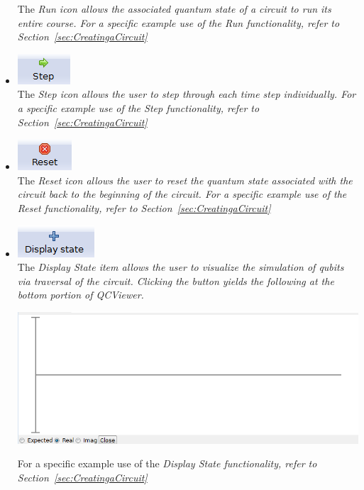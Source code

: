 \documentclass[10pt]{article}
\theoremstyle{definition}
\begin{document}
\begin{itemize}
The \em Run \em icon allows the associated quantum state of a circuit to run its entire course. For a specific example use of the \em Run \em functionality, refer to Section~\ref{sec:CreatingaCircuit}

\item \includegraphics{Figures/Navigation/Step.png}\\

The \em Step \em icon allows the user to step through each time step individually. For a specific example use of the \em Step \em functionality, refer to Section~\ref{sec:CreatingaCircuit}

\item \includegraphics{Figures/Navigation/Reset.png}\\ 

The \em Reset \em icon allows the user to reset the quantum state associated with the circuit back to the beginning of the circuit. For a specific example use of the \em Reset \em functionality, refer to Section~\ref{sec:CreatingaCircuit}

\item \includegraphics{Figures/Navigation/DisplayState.png} \\

The \em Display State \em item allows the user to visualize the simulation of qubits via traversal of the circuit. Clicking the button yields the following at the bottom portion of QCViewer.

\begin{center}
\includegraphics[scale=0.75]{Figures/DisplayState.png}
\end{center}

For a specific example use of the \em Display State \em functionality, refer to Section~\ref{sec:CreatingaCircuit}

\end{itemize}
\end{document}
